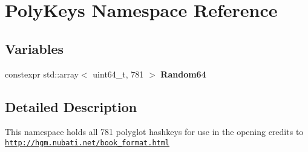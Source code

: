 \hypertarget{namespacePolyKeys}{}\section{Poly\+Keys Namespace Reference}
\label{namespacePolyKeys}
\subsection*{Variables}
\begin{DoxyCompactItemize}
\item 
\mbox{\label{namespacePolyKeys_a73b985817b2e7128911882709e3bed18}} 
constexpr std\+::array$<$ uint64\+\_\+t, 781 $>$ {\bfseries Random64}
\end{DoxyCompactItemize}


\subsection{Detailed Description}
This namespace holds all 781 polyglot hashkeys for use in the opening credits to \href{http://hgm.nubati.net/book_format.html}{\tt http\+://hgm.\+nubati.\+net/book\+\_\+format.\+html} 